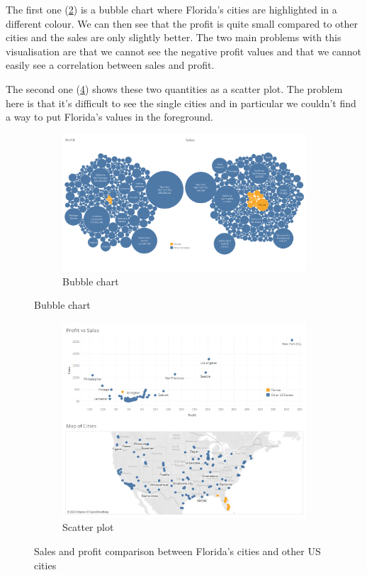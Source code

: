 \documentclass[openany]{article}
\begin{document}
The first one (\ref {bubbles}) is a bubble chart where Florida's cities are highlighted in a different colour. We can then see that the profit is quite small compared to other cities and the sales are only slightly better. The two main problems with this visualisation are that we cannot see the negative profit values and that we cannot easily see a correlation between sales and profit.

The second one (\ref {scatter_plot}) shows these two quantities as a scatter plot. The problem here is that it's difficult to see the single cities and in particular we couldn't find a way to put Florida's values in the foreground.

\begin{figure}[h]
	\centering
	\begin{subfigure}{\textwidth}
		\centering
		\includegraphics[width=\linewidth]{Tableau/d_a}
		\caption{Bubble chart}
		\label {bubbles}
	\end{subfigure}
\end{figure}

\begin{figure}[h]\ContinuedFloat
	\centering
	\begin{subfigure}{\textwidth}
		\centering
		\includegraphics[width=\linewidth]{Tableau/d_b}
		\caption{Scatter plot}
		\label {scatter_plot}
	\end{subfigure}
	\caption{Sales and profit comparison between Florida's cities and other US cities}
\end{figure}
\end{document}
